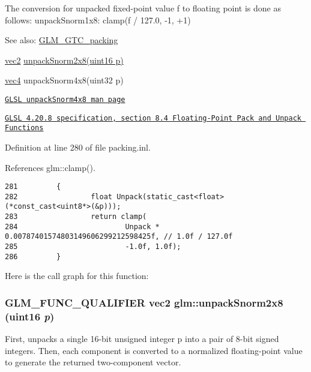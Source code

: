 The conversion for unpacked fixed-point value f to floating point is done as follows: unpackSnorm1x8: clamp(f / 127.0, -1, +1)

\begin{Desc}
\item[See also:]\hyperlink{group__gtc__packing}{GLM\_\-GTC\_\-packing} 

\hyperlink{group__core__types_ga1618f51db67eaa145db101d8c8431d8}{vec2} \hyperlink{group__gtc__packing_g27f30f0281b88e152b0895f5e2ead878}{unpackSnorm2x8(uint16 p)} 

\hyperlink{group__core__types_g5881b1b022d7fd1b7218f5916532dd02}{vec4} unpackSnorm4x8(uint32 p) 

\href{http://www.opengl.org/sdk/docs/manglsl/xhtml/unpackSnorm4x8.xml}{\tt GLSL unpackSnorm4x8 man page} 

\href{http://www.opengl.org/registry/doc/GLSLangSpec.4.20.8.pdf}{\tt GLSL 4.20.8 specification, section 8.4 Floating-Point Pack and Unpack Functions} \end{Desc}


Definition at line 280 of file packing.inl.

References glm::clamp().

\begin{Code}\begin{verbatim}281         {
282                 float Unpack(static_cast<float>(*const_cast<uint8*>(&p)));
283                 return clamp(
284                         Unpack * 0.00787401574803149606299212598425f, // 1.0f / 127.0f
285                         -1.0f, 1.0f);
286         }
\end{verbatim}
\end{Code}




Here is the call graph for this function:\hypertarget{group__gtc__packing_g27f30f0281b88e152b0895f5e2ead878}{
\subsubsection[unpackSnorm2x8]{\setlength{\rightskip}{0pt plus 5cm}GLM\_\-FUNC\_\-QUALIFIER vec2 glm::unpackSnorm2x8 (uint16 {\em p})}}
\label{group__gtc__packing_g27f30f0281b88e152b0895f5e2ead878}


First, unpacks a single 16-bit unsigned integer p into a pair of 8-bit signed integers. Then, each component is converted to a normalized floating-point value to generate the returned two-component vector.

